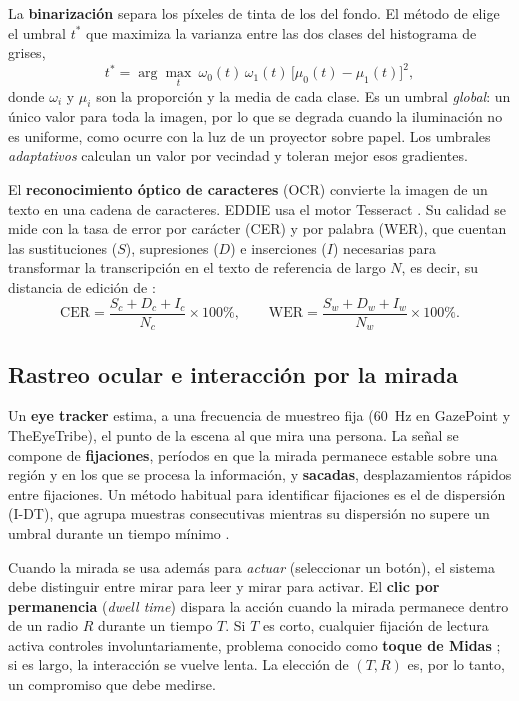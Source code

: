 La \textbf{binarización} separa los píxeles de tinta de los del fondo. El método de \citet{otsu1979} elige el umbral $t^\ast$ que maximiza la varianza entre las dos clases del histograma de grises,
\begin{equation}
t^\ast=\arg\max_{t}\ \omega_0(t)\,\omega_1(t)\,\bigl[\mu_0(t)-\mu_1(t)\bigr]^2,
\end{equation}
donde $\omega_i$ y $\mu_i$ son la proporción y la media de cada clase. Es un umbral \emph{global}: un único valor para toda la imagen, por lo que se degrada cuando la iluminación no es uniforme, como ocurre con la luz de un proyector sobre papel. Los umbrales \emph{adaptativos} calculan un valor por vecindad y toleran mejor esos gradientes.

El \textbf{reconocimiento óptico de caracteres} (OCR) convierte la imagen de un texto en una cadena de caracteres. EDDIE usa el motor Tesseract \citep{smith2007}. Su calidad se mide con la tasa de error por carácter (CER) y por palabra (WER), que cuentan las sustituciones ($S$), supresiones ($D$) e inserciones ($I$) necesarias para transformar la transcripción en el texto de referencia de largo $N$, es decir, su distancia de edición de \citet{levenshtein1966}:
\begin{equation}
\mathrm{CER}=\frac{S_c+D_c+I_c}{N_c}\times100\%,\qquad
\mathrm{WER}=\frac{S_w+D_w+I_w}{N_w}\times100\%.
\end{equation}

\subsection{Rastreo ocular e interacción por la mirada}

Un \textbf{eye tracker} estima, a una frecuencia de muestreo fija (60~Hz en GazePoint y TheEyeTribe), el punto de la escena al que mira una persona. La señal se compone de \textbf{fijaciones}, períodos en que la mirada permanece estable sobre una región y en los que se procesa la información, y \textbf{sacadas}, desplazamientos rápidos entre fijaciones. Un método habitual para identificar fijaciones es el de dispersión (I-DT), que agrupa muestras consecutivas mientras su dispersión no supere un umbral durante un tiempo mínimo \citep{salvucci2000}.

Cuando la mirada se usa además para \emph{actuar} (seleccionar un botón), el sistema debe distinguir entre mirar para leer y mirar para activar. El \textbf{clic por permanencia} (\textit{dwell time}) dispara la acción cuando la mirada permanece dentro de un radio $R$ durante un tiempo $T$. Si $T$ es corto, cualquier fijación de lectura activa controles involuntariamente, problema conocido como \textbf{toque de Midas} \citep{jacob1990}; si es largo, la interacción se vuelve lenta. La elección de $(T,R)$ es, por lo tanto, un compromiso que debe medirse.

